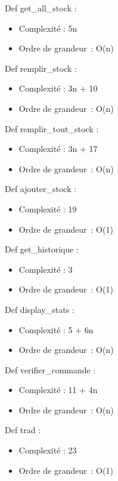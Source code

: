 \documentclass[]{article}
\begin{document}
Def get\_all\_stock :

\begin{itemize}
\item
  Complexité : 5n
\item
  Ordre de grandeur~: O(n)
\end{itemize}

Def remplir\_stock :

\begin{itemize}
\item
  Complexité : 3n + 10
\item
  Ordre de grandeur~: O(n)
\end{itemize}

Def remplir\_tout\_stock :

\begin{itemize}
\item
  Complexité : 3n + 17
\item
  Ordre de grandeur~: O(n)
\end{itemize}

Def ajouter\_stock :

\begin{itemize}
\item
  Complexité : 19
\item
  Ordre de grandeur~: O(1)
\end{itemize}

Def get\_historique :

\begin{itemize}
\item
  Complexité : 3
\item
  Ordre de grandeur~: O(1)
\end{itemize}

Def display\_stats :

\begin{itemize}
\item
  Complexité : 5 + 6n
\item
  Ordre de grandeur~: O(n)
\end{itemize}

Def verifier\_commande :

\begin{itemize}
\item
  Complexité : 11 + 4n
\item
  Ordre de grandeur~: O(n)
\end{itemize}

Def trad :

\begin{itemize}
\item
  Complexité : 23
\item
  Ordre de grandeur~: O(1)
\end{itemize}
\end{document}
